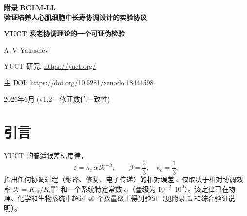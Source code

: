 \documentclass[12pt,a4paper]{article}
\newcommand{\REL}{\mathcal{K}}          %
\begin{document}
	
	\begin{titlepage}
		\centering
		\vspace*{2cm}
		{\Huge\bfseries 附录 BCLM-LL\\[0.3cm]
			验证培养人心肌细胞中长寿协调设计的实验协议\par}
		\vspace{0.5cm}
		{\Large\bfseries YUCT 衰老协调理论的一个可证伪检验\par}
		\vspace{1.5cm}
		{\large A.\,V.\,Yakushev\par}
		{\normalsize YUCT 研究, \url{https://yuct.org/}\par}
		\vspace{0.5cm}
		{\normalsize 主 DOI: \url{https://doi.org/10.5281/zenodo.18444598}\par}
		\vspace{0.5cm}
		{\normalsize 2026年6月 (v1.2 – 修正数值一致性)\par}
		\vfill
		\begin{abstract}
			\noindent
			雅库舍夫统一协调理论 (YUCT) 将衰老解释为细胞子系统协调效率 \(K_{\mathrm{eff}}\) 的渐进性下降。生物协调拉格朗日量 (BCLM，附录 BCLM) 提供了一个数学框架，用于从序列数据计算 \(K_{\mathrm{eff}}\)，并设计将其恢复到幼年水平的遗传干预。本协议描述了一个完整的、自洽的实验，用于在培养的人心肌细胞中检验长寿协调设计。我们指定了要改造的确切基因，计算了它们天然和优化后的相对协调效率 \(\REL\)，直接从普适误差律 \(\varepsilon = \kappa_c \alpha \REL^{-\beta}\) (\(\beta=2/3\)，\(\kappa_c=1/3\)) 推导出关于突变率、氧化应激、蛋白质聚集、迁移速度和细胞寿命的定量预言，并提供了逐步实验时间表。还包含了一个受控回归模块 (CCR) 以证明衰老表型的可逆性。所有预言均已预注册，并可使用标准细胞生物学检测进行证伪。出于伦理原因，本协议有意省略了 \textit{体内} 递送方法；读者可参考附录~\(\Sigma\)。
		\end{abstract}
	\end{titlepage}
	
	\tableofcontents
	\newpage
	
	\section{引言}
	\label{sec:intro}
	YUCT 的普适误差标度律，
	\begin{equation}
		\varepsilon = \kappa_c \, \alpha \, \REL^{-\beta}, \qquad \beta = \frac{2}{3},\quad \kappa_c = \frac{1}{3},
		\label{eq:error-law}
	\end{equation}
	指出任何协调过程（翻译、修复、电子传递）的相对误差 \(\varepsilon\) 仅取决于相对协调效率 \(\REL = K_{\mathrm{eff}}/K_{\mathrm{eff}}^{\max}\) 和一个系统特定常数 \(\alpha\)（量级为 \(10^{-2}\)–\(10^{0}\)）。该定律已在物理、化学和生物系统中超过 40 个数量级上得到验证（见附录 L 和综合验证说明）。
	
\end{document}
